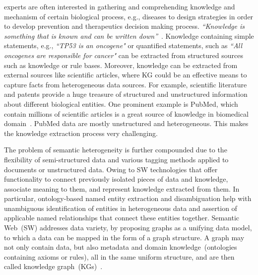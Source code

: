 \documentclass[10pt,journal,compsoc]{IEEEtran}
\begin{document}
\IEEEdisplaynontitleabstractindextext
\IEEEpeerreviewmaketitle



 experts are often interested in gathering and comprehending knowledge and mechanism of certain biological process, e.g., diseases to design strategies in order to develop prevention and therapeutics decision making process. \textit{``Knowledge is something that is known and can be written down''}~\cite{nonakatakeuchi1995}. Knowledge containing simple statements, e.g., \textit{``TP53 is an oncogene"} or quantified statements, such as \textit{``All oncogenes are responsible for cancer"} can be extracted from structured sources such as knowledge or rule bases. Moreover, knowledge can be extracted from external sources like scientific articles, where KG could be an effective means to capture facts from heterogeneous data sources. For example, scientific literature and patents provide a huge treasure of structured and unstructured information about different biological entities. One prominent example is PubMed, which contain millions of scientific articles is a great source of knowledge in biomedical domain~\cite{xu2020building}. PubMed data are mostly unstructured and heterogeneous. This makes the knowledge extraction process very challenging. 

The problem of semantic heterogeneity is further compounded due to the flexibility of semi-structured data and various tagging methods applied to documents or unstructured data. Owing to SW technologies that offer functionality to connect previously isolated pieces of data and knowledge, associate meaning to them, and represent knowledge extracted from them. In particular, ontology-based named entity extraction and disambiguation help with unambiguous identification of entities in heterogeneous data and assertion of applicable named relationships that connect these entities together. Semantic Web~(SW) addresses data variety, by proposing graphs as a unifying data model, to which a data can be mapped in the form of a graph structure. A graph may not only contain data, but also metadata and domain knowledge~(ontologies containing axioms or rules), all in the same uniform structure, and are then called knowledge graph~(KGs)~\cite{wilcke2017knowledge,hogan2020knowledge}. 
\end{document}
